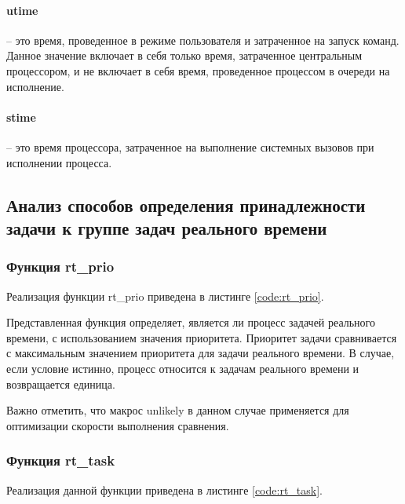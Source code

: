 \paragraph*{utime} -- это время, проведенное в режиме пользователя и затраченное на запуск команд. Данное значение включает в себя только время, затраченное центральным процессором, и не включает в себя время, проведенное процессом в очереди на исполнение.

\paragraph*{stime} -- это время процессора, затраченное на выполнение системных вызовов при исполнении процесса.

\subsection{Анализ способов определения принадлежности задачи к группе задач реального времени}

\subsubsection{Функция rt\_prio}
Реализация функции rt\_prio приведена в листинге \ref{code:rt_prio}.


Представленная функция определяет, является ли процесс задачей реального времени, с использованием значения приоритета. Приоритет задачи сравнивается с максимальным значением приоритета для задачи реального времени. В случае, если условие истинно, процесс относится к задачам реального времени и возвращается единица.

Важно отметить, что макрос unlikely в данном случае применяется для оптимизации скорости выполнения сравнения.

\subsubsection{Функция rt\_task}
Реализация данной функции приведена в листинге \ref{code:rt_task}.

